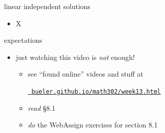 \documentclass[urlcolor=blue,dvipsnames]{beamer}
\begin{document}
\begin{frame}{linear independent solutions}

\begin{itemize}
\item X
\end{itemize}
\end{frame}


\begin{frame}{expectations}

\begin{itemize}
\item just watching this video is \emph{not} enough!
     \begin{itemize}
     \item see ``found online'' videos and stuff at

     \centerline{\href{https://bueler.github.io/math302/week13.html}{\tt \color{cyan} bueler.github.io/math302/week13.html}}
     \item \emph{read} \S8.1
     \item \emph{do} the WebAssign exercises for section 8.1
     \end{itemize}
\end{itemize}
\end{frame}
\end{document}
